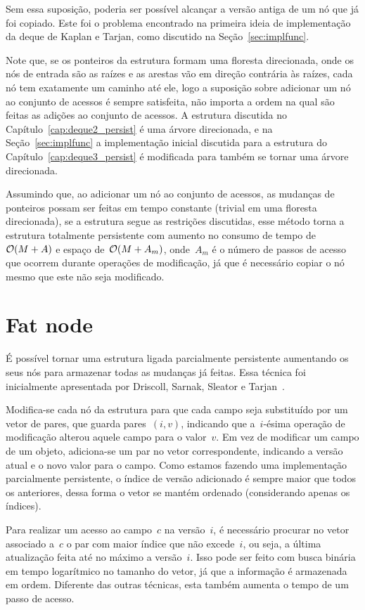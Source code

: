 \documentclass[../../main.tex]{subfiles}
\begin{document}
Sem essa suposição, poderia ser possível alcançar a versão antiga de um nó que já foi copiado. Este foi o problema encontrado na primeira ideia de implementação da deque de Kaplan e Tarjan, como discutido na Seção~\ref{sec:implfunc}.

Note que, se os ponteiros da estrutura formam uma floresta direcionada, onde os nós de entrada são as raízes e as arestas vão em direção contrária às raízes, cada nó tem exatamente um caminho até ele, logo a suposição sobre adicionar um nó ao conjunto de acessos é sempre satisfeita, não importa a ordem na qual são feitas as adições ao conjunto de acessos. A estrutura discutida no Capítulo~\ref{cap:deque2_persist} é uma árvore direcionada, e na Seção~\ref{sec:implfunc} a implementação inicial discutida para a estrutura do Capítulo~\ref{cap:deque3_persist} é modificada para também se tornar uma árvore direcionada.

Assumindo que, ao adicionar um nó ao conjunto de acessos, as mudanças de ponteiros possam ser feitas em tempo constante (trivial em uma floresta direcionada), se a estrutura segue as restrições discutidas, esse método torna a estrutura totalmente persistente com aumento no consumo de tempo de~$\mathcal{O}(M+A)$ e espaço de~$\mathcal{O}(M+A_m)$, onde~$A_m$ é o número de passos de acesso que ocorrem durante operações de modificação, já que é necessário copiar o nó mesmo que este não seja modificado.


\section{Fat node}

É possível tornar uma estrutura ligada parcialmente persistente aumentando os seus nós para armazenar todas as mudanças já feitas. Essa técnica foi inicialmente apresentada por Driscoll, Sarnak, Sleator e Tarjan~\cite{DriscollSST1989}.

Modifica-se cada nó da estrutura para que cada campo seja substituído por um vetor de pares, que guarda pares~$(i, v)$, indicando que a~$i$-ésima operação de modificação alterou aquele campo para o valor~$v$. Em vez de modificar um campo de um objeto, adiciona-se um par no vetor correspondente, indicando a versão atual e o novo valor para o campo. Como estamos fazendo uma implementação parcialmente persistente, o índice de versão adicionado é sempre maior que todos os anteriores, dessa forma o vetor se mantém ordenado (considerando apenas os índices).

Para realizar um acesso ao campo~$c$ na versão~$i$, é necessário procurar no vetor associado a~$c$ o par com maior índice que não excede~$i$, ou seja, a última atualização feita até no máximo a versão~$i$. Isso pode ser feito com busca binária em tempo logarítmico no tamanho do vetor, já que a informação é armazenada em ordem. Diferente das outras técnicas, esta também aumenta o tempo de um passo de acesso.
\end{document}
